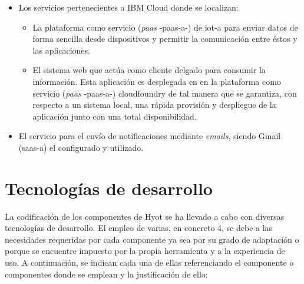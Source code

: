 \documentclass[12pt,a4paper, twoside]{report}
\begin{document}
\begin{itemize}
\begin{itemize}
			\item Los servicios pertenecientes a IBM Cloud donde se localizan:
						
			\begin{itemize}
				\item La plataforma como servicio (\textit{\gls{paas}} -\gls{paas-a}-) de \gls{iot-a} para enviar datos de forma sencilla desde dispositivos y permitir la comunicación entre éstos y las aplicaciones. %
				\item El sistema web que actúa como cliente delgado para consumir la información. Esta aplicación es desplegada en  en la plataforma como servicio (\textit{\gls{paas}} -\gls{paas-a}-) \cite{gonzalez:2011:TCCS} \gls{cloudfoundry} de tal manera que se garantiza, con respecto a un sistema local, una rápida provisión y despliegue de la aplicación junto con una total disponibilidad.  
				
			\end{itemize}
			
			\item El servicio para el envío de notificaciones mediante \textit{emails}, siendo Gmail (\gls{saas-a}) el configurado y utilizado.
		\end{itemize}
	\end{itemize}
			
	\section{Tecnologías de desarrollo}
	
	La codificación de los componentes de Hyot se ha llevado a cabo con diversas tecnologías de desarrollo. El empleo de varias, en concreto 4, se debe a las necesidades requeridas por cada componente ya sea por su grado de adaptación o porque se encuentre impuesto por la propia herramienta y a la experiencia de uso. A continuación, se indican cada una de ellas referenciando el componente o componentes donde se emplean y la justificación de ello:
	
\end{document}
